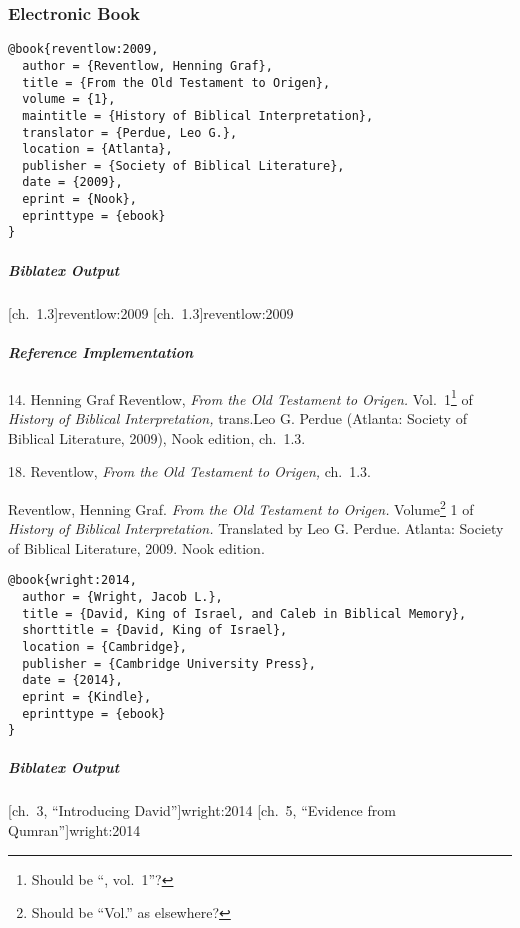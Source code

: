 \documentclass[a4paper]{article}
\newenvironment{biboutput}{%
  \subparagraph{Biblatex Output}
}{\color{black}}
\newenvironment{refimp}{%
  \subparagraph{Reference Implementation}
  \color{reference-colour}
  \rm
}{\par\color{black}}
\begin{document}
\subsubsection{Electronic Book}

\begin{lstlisting}
@book{reventlow:2009,
  author = {Reventlow, Henning Graf},
  title = {From the Old Testament to Origen},
  volume = {1},
  maintitle = {History of Biblical Interpretation},
  translator = {Perdue, Leo G.},
  location = {Atlanta},
  publisher = {Society of Biblical Literature},
  date = {2009},
  eprint = {Nook},
  eprinttype = {ebook}
}
\end{lstlisting}

\begin{biboutput}
  [ch.~1.3]{reventlow:2009}
  [ch.~1.3]{reventlow:2009}
\end{biboutput}

\begin{refimp}
  \hspace*{\bibindent}14. Henning Graf Reventlow, \emph{From the Old Testament
  to Origen.} Vol.~1\footnote{Should be “, vol.~1”?} of \emph{History of
  Biblical Interpretation,} trans.\@ Leo G. Perdue (Atlanta: Society of
  Biblical Literature, 2009), Nook edition, ch.~1.3.

  \hspace*{\bibindent}18. Reventlow, \emph{From the Old Testament to Origen,}
  ch.~1.3.
  
  \hangindent\bibindent Reventlow, Henning Graf. \emph{From the Old Testament
  to Origen.} Volume\footnote{Should be “Vol.” as elsewhere?} 1 of
  \emph{History of Biblical Interpretation.} Translated by Leo G. Perdue.
  Atlanta: Society of Biblical Literature, 2009. Nook edition.
\end{refimp}

\medskip

\begin{lstlisting}
@book{wright:2014,
  author = {Wright, Jacob L.},
  title = {David, King of Israel, and Caleb in Biblical Memory},
  shorttitle = {David, King of Israel},
  location = {Cambridge},
  publisher = {Cambridge University Press},
  date = {2014},
  eprint = {Kindle},
  eprinttype = {ebook}
}
\end{lstlisting}

\begin{biboutput}
  [ch.~3, \mkbibquote{Introducing David}]{wright:2014}
  [ch.~5, \mkbibquote{Evidence from Qumran}]{wright:2014}
\end{biboutput}
\end{document}
